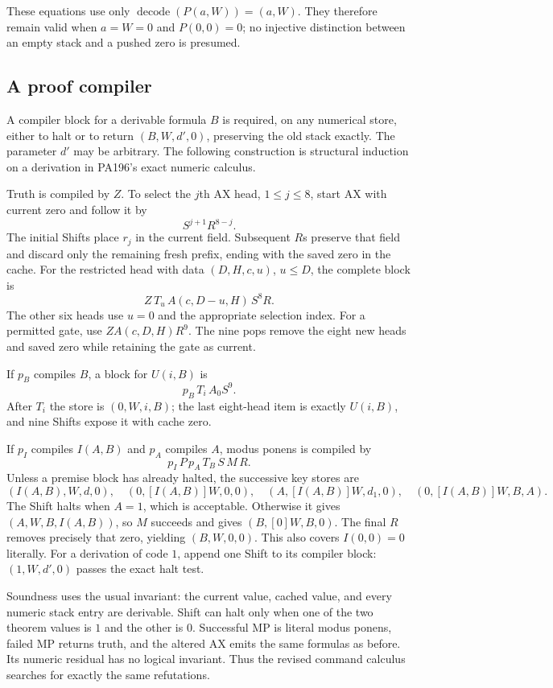 These equations use only $\operatorname{decode}(P(a,W))=(a,W)$.
They therefore remain valid when $a=W=0$ and $P(0,0)=0$; no injective
distinction between an empty stack and a pushed zero is presumed.

\subsection{A proof compiler}

A compiler block for a derivable formula $B$ is required, on any numerical
store, either to halt or to return $(B,W,d',0)$, preserving the old stack
exactly. The parameter $d'$ may be arbitrary. The following construction is
structural induction on a derivation in PA196's exact numeric calculus.

Truth is compiled by $Z$. To select the $j$th AX head, $1\le j\le8$,
start AX with current zero and follow it by
\[
 S^{j+1}R^{8-j}.
\]
The initial Shifts place $r_j$ in the current field. Subsequent $R$s
preserve that field and discard only the remaining fresh prefix, ending
with the saved zero in the cache. For the restricted head with data
$(D,H,c,u)$, $u\le D$, the complete block is
\[
 Z\,T_u\,A(c,D-u,H)\,S^8R.
\]
The other six heads use $u=0$ and the appropriate selection index.
For a permitted gate, use $Z A(c,D,H) R^9$. The nine pops remove the
eight new heads and saved zero while retaining the gate as current.

If $p_B$ compiles $B$, a block for $U(i,B)$ is
\[
 p_B\,T_i\,A_0S^9.
\]
After $T_i$ the store is $(0,W,i,B)$; the last eight-head item is exactly
$U(i,B)$, and nine Shifts expose it with cache zero.

If $p_I$ compiles $I(A,B)$ and $p_A$ compiles $A$, modus ponens is compiled
by
\[
 p_I\,P\,p_A\,T_B\,S\,M\,R.
\]
Unless a premise block has already halted, the successive key stores are
\[
 (I(A,B),W,d,0),\quad(0,[I(A,B)]W,0,0),\quad
 (A,[I(A,B)]W,d_1,0),\quad(0,[I(A,B)]W,B,A).
\]
The Shift halts when $A=1$, which is acceptable. Otherwise it gives
$(A,W,B,I(A,B))$, so $M$ succeeds and gives $(B,[0]W,B,0)$.
The final $R$ removes precisely that zero, yielding $(B,W,0,0)$.
This also covers $I(0,0)=0$ literally. For a derivation of code $1$,
append one Shift to its compiler block: $(1,W,d',0)$ passes the exact
halt test.

Soundness uses the usual invariant: the current value, cached value, and
every numeric stack entry are derivable. Shift can halt only when one of
the two theorem values is $1$ and the other is $0$. Successful MP is
literal modus ponens, failed MP returns truth, and the altered AX emits
the same formulas as before. Its numeric residual has no logical invariant.
Thus the revised command calculus searches for exactly the same refutations.


